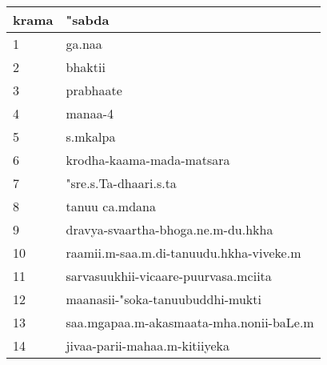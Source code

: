 \documentclass[a6paper]{article}
\begin{document}
\begin{tabular}{|l|l|}
\hline
krama & "sabda\\
\hline
1 & ga.naa \\
\hline
2 & bhaktii \\
\hline
3 & prabhaate \\
\hline
4 & manaa-4 \\
\hline
5 & s.mkalpa \\
\hline
6 & krodha-kaama-mada-matsara \\
\hline
7 & "sre.s.Ta-dhaari.s.ta \\
\hline
8 & tanuu ca.mdana\\
\hline
9 & dravya-svaartha-bhoga.ne.m-du.hkha\\
\hline
10 & raamii.m-saa.m.di-tanuudu.hkha-viveke.m\\
\hline
11 & sarvasuukhii-vicaare-puurvasa.mciita\\
\hline
12 & maanasii-"soka-tanuubuddhi-mukti\\
\hline
13 & saa.mgapaa.m-akasmaata-mha.nonii-baLe.m\\
\hline
14 & jivaa-parii-mahaa.m-kitiiyeka\\
\hline
\end{tabular}
        
\end{document}
